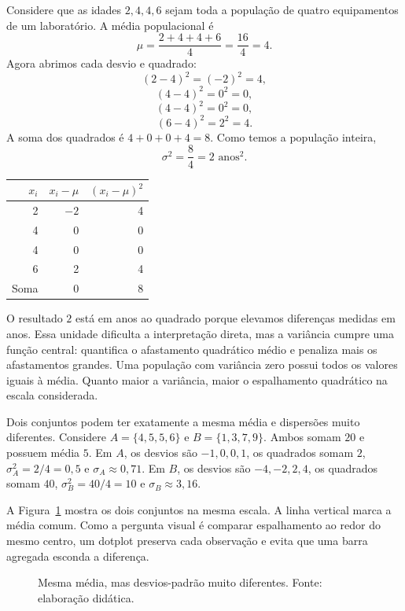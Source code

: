 Considere que as idades ${2,4,4,6}$ sejam toda a população de quatro equipamentos de um laboratório. A média populacional é
\[
\mu=\frac{2+4+4+6}{4}=\frac{16}{4}=4.
\]
Agora abrimos cada desvio e quadrado:
\[
(2-4)^2=(-2)^2=4,
\]
\[
(4-4)^2=0^2=0,
\]
\[
(4-4)^2=0^2=0,
\]
\[
(6-4)^2=2^2=4.
\]
A soma dos quadrados é $4+0+0+4=8$. Como temos a população inteira,
\[
\sigma^2=\frac{8}{4}=2\text{ anos}^2.
\]

\begin{center}
\small
\begin{tabular}{@{}rrr@{}}
\toprule
$x_i$ & $x_i-\mu$ & $(x_i-\mu)^2$ \\
\midrule
2 & $-2$ & 4 \\
4 & 0 & 0 \\
4 & 0 & 0 \\
6 & 2 & 4 \\
\midrule
Soma & 0 & 8 \\
\bottomrule
\end{tabular}
\end{center}

O resultado $2$ está em anos ao quadrado porque elevamos diferenças medidas em anos. Essa unidade dificulta a interpretação direta, mas a variância cumpre uma função central: quantifica o afastamento quadrático médio e penaliza mais os afastamentos grandes. Uma população com variância zero possui todos os valores iguais à média. Quanto maior a variância, maior o espalhamento quadrático na escala considerada.

Dois conjuntos podem ter exatamente a mesma média e dispersões muito diferentes. Considere $A=\{4,5,5,6\}$ e $B=\{1,3,7,9\}$. Ambos somam $20$ e possuem média $5$. Em $A$, os desvios são $-1,0,0,1$, os quadrados somam $2$, $\sigma_A^2=2/4=0{,}5$ e $\sigma_A\approx0{,}71$. Em $B$, os desvios são $-4,-2,2,4$, os quadrados somam $40$, $\sigma_B^2=40/4=10$ e $\sigma_B\approx3{,}16$.

A Figura~\ref{fig:mesma-media-dispersao} mostra os dois conjuntos na mesma escala. A linha vertical marca a média comum. Como a pergunta visual é comparar espalhamento ao redor do mesmo centro, um dotplot preserva cada observação e evita que uma barra agregada esconda a diferença.

\begin{figure}[htbp]
\centering
{}
\caption{Mesma média, mas desvios-padrão muito diferentes. Fonte: elaboração didática.}
\label{fig:mesma-media-dispersao}
\end{figure}

